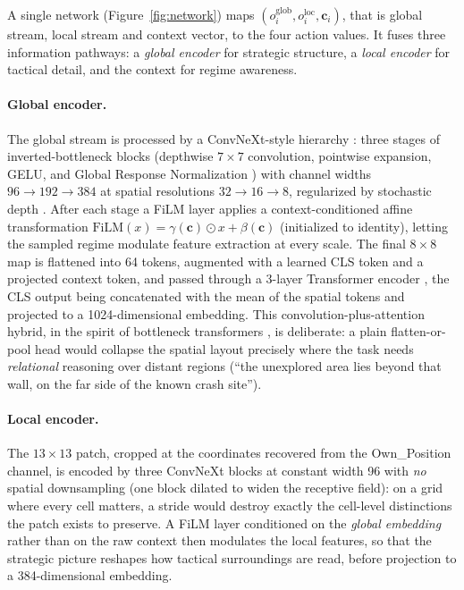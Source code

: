 A single network (Figure~\ref{fig:network}) maps
$(o_i^{\mathrm{glob}}, o_i^{\mathrm{loc}}, \mathbf{c}_i)$, that is global stream,
local stream and context vector, to the four action values. It fuses three
information pathways: a \emph{global encoder} for strategic structure, a
\emph{local encoder} for tactical detail, and the context for regime awareness.

\paragraph{Global encoder.}
The global stream is processed by a ConvNeXt-style hierarchy
\citep{liu2022convnet}: three stages of inverted-bottleneck blocks (depthwise
$7\times7$ convolution, pointwise expansion, GELU, and Global Response
Normalization \citep{woo2023convnext}) with channel widths $96 \to 192 \to 384$
at spatial resolutions $32 \to 16 \to 8$, regularized by stochastic depth
\citep{huang2016deep}. After each stage a FiLM layer \citep{perez2018film}
applies a context-conditioned affine transformation
$\mathrm{FiLM}(x) = \gamma(\mathbf{c})\odot x + \beta(\mathbf{c})$ (initialized
to identity), letting the sampled regime modulate feature extraction at every
scale. The final $8\times8$ map is flattened into 64 tokens, augmented with a
learned CLS token and a projected context token, and passed through a 3-layer
Transformer encoder \citep{vaswani2017attention}, the CLS output being
concatenated with the mean of the spatial tokens and projected to a
1024-dimensional embedding. This convolution-plus-attention hybrid, in the spirit
of bottleneck transformers \citep{srinivas2021botnet}, is deliberate: a plain
flatten-or-pool head would collapse the spatial layout precisely where the task
needs \emph{relational} reasoning over distant regions (``the unexplored area
lies beyond that wall, on the far side of the known crash site'').

\paragraph{Local encoder.}
The $13\times13$ patch, cropped at the coordinates recovered from the
Own\_\allowbreak Position channel, is encoded by three ConvNeXt blocks at constant width
96 with \emph{no} spatial downsampling (one block dilated to widen the receptive
field): on a grid where every cell matters, a stride would destroy exactly the
cell-level distinctions the patch exists to preserve. A FiLM layer conditioned on
the \emph{global embedding} rather than on the raw context then modulates the
local features, so that the strategic picture reshapes how tactical surroundings
are read, before projection to a 384-dimensional embedding.

